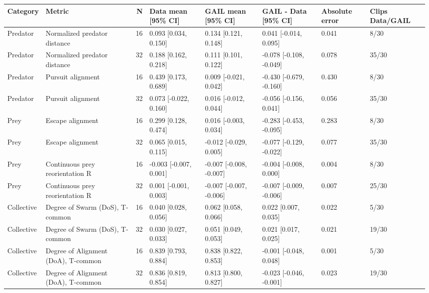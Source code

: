 \begin{tabular}{llrlllll}
\toprule
Category & Metric & N & Data mean [95\% CI] & GAIL mean [95\% CI] & GAIL - Data [95\% CI] & Absolute error & Clips Data/GAIL \\
\midrule
Predator & Normalized predator distance & 16 & 0.093 [0.034, 0.150] & 0.134 [0.121, 0.148] & 0.041 [-0.014, 0.095] & 0.041 & 8/30 \\
Predator & Normalized predator distance & 32 & 0.188 [0.162, 0.218] & 0.111 [0.101, 0.122] & -0.078 [-0.108, -0.049] & 0.078 & 35/30 \\
Predator & Pursuit alignment & 16 & 0.439 [0.173, 0.689] & 0.009 [-0.021, 0.042] & -0.430 [-0.679, -0.160] & 0.430 & 8/30 \\
Predator & Pursuit alignment & 32 & 0.073 [-0.022, 0.160] & 0.016 [-0.012, 0.044] & -0.056 [-0.156, 0.041] & 0.056 & 35/30 \\
Prey & Escape alignment & 16 & 0.299 [0.128, 0.474] & 0.016 [-0.003, 0.034] & -0.283 [-0.453, -0.095] & 0.283 & 8/30 \\
Prey & Escape alignment & 32 & 0.065 [0.015, 0.115] & -0.012 [-0.029, 0.005] & -0.077 [-0.129, -0.022] & 0.077 & 35/30 \\
Prey & Continuous prey reorientation R & 16 & -0.003 [-0.007, 0.001] & -0.007 [-0.008, -0.007] & -0.004 [-0.008, 0.000] & 0.004 & 8/30 \\
Prey & Continuous prey reorientation R & 32 & 0.001 [-0.001, 0.003] & -0.007 [-0.007, -0.006] & -0.007 [-0.009, -0.006] & 0.007 & 25/30 \\
Collective & Degree of Swarm (DoS), T-common & 16 & 0.040 [0.028, 0.056] & 0.062 [0.058, 0.066] & 0.022 [0.007, 0.035] & 0.022 & 5/30 \\
Collective & Degree of Swarm (DoS), T-common & 32 & 0.030 [0.027, 0.033] & 0.051 [0.049, 0.053] & 0.021 [0.017, 0.025] & 0.021 & 19/30 \\
Collective & Degree of Alignment (DoA), T-common & 16 & 0.839 [0.793, 0.884] & 0.838 [0.822, 0.853] & -0.001 [-0.048, 0.048] & 0.001 & 5/30 \\
Collective & Degree of Alignment (DoA), T-common & 32 & 0.836 [0.819, 0.854] & 0.813 [0.800, 0.827] & -0.023 [-0.046, -0.001] & 0.023 & 19/30 \\
\bottomrule
\end{tabular}
